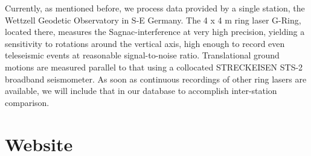 \documentclass[12pt,reqno,letter]{article} %
\begin{document}
Currently, as mentioned before, we process data provided by a single station, the Wettzell Geodetic Observatory in S-E Germany. The 4 x 4 m ring laser G-Ring, located there, measures the Sagnac-interference at very high precision, yielding a sensitivity to rotations around the vertical axis, high enough to record even teleseismic events at reasonable signal-to-noise ratio.
Translational ground motions are measured parallel to that using a collocated STRECKEISEN STS-2 broadband seismometer. As soon as continuous recordings of other ring lasers are available, we will include that in our database to accomplish inter-station comparison.\\
% 
% 
\section{Website}
\label{sec:website}
\end{document}
